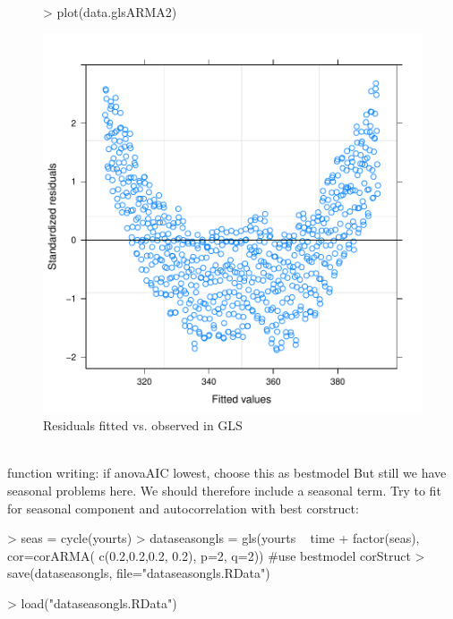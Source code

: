 \documentclass[11pt, a4paper]{article} %
\begin{document}
\begin{figure}[H]
\centering
\begin{Schunk}
\begin{Sinput}
> plot(data.glsARMA2)
\end{Sinput}
\end{Schunk}
\includegraphics{alleselena-residual}
\caption{Residuals fitted vs. observed in GLS}
\label{residual}
\end{figure}\\

\noindent function writing: if anovaAIC lowest, choose this as bestmodel
But still we have seasonal problems here. We should therefore include a seasonal term.
Try to fit for seasonal component and autocorrelation with best corstruct:

\begin{Schunk}
\begin{Sinput}
> seas = cycle(yourts)
> dataseasongls = gls(yourts ~ time + factor(seas), cor=corARMA( c(0.2,0.2,0.2, 0.2),
                 p=2, q=2)) #use bestmodel corStruct
> save(dataseasongls, file="dataseasongls.RData")
\end{Sinput}
\end{Schunk}

\begin{Schunk}
\begin{Sinput}
> load("dataseasongls.RData")
\end{Sinput}
\end{Schunk}
\end{document}
